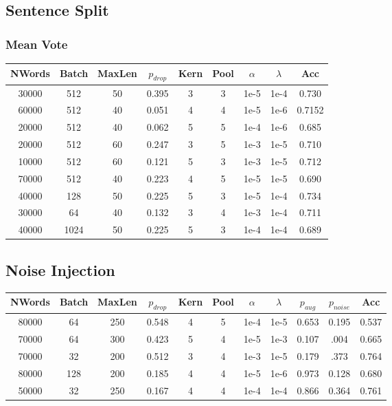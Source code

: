 \subsection{Sentence Split}
\subsubsection{Mean Vote}
\begin{center}\begin{tabular}{||c c c c c c c c c ||}
 \hline
 NWords & Batch & MaxLen & $p_{drop}$ & Kern & Pool & $\alpha$ & $\lambda$ & Acc\\ [0.5ex]
 \hline\hline
 30000 & 512 & 50 & 0.395 & 3 & 3 & 1e-5 & 1e-4 & 0.730\\
 \hline
 60000 & 512 & 40 & 0.051 & 4 & 4 & 1e-5 & 1e-6 & 0.7152\\
 \hline
 20000 & 512 & 40 & 0.062 & 5 & 5 & 1e-4 & 1e-6 & 0.685\\
 \hline
 20000 & 512 & 60 & 0.247 & 3 & 5 & 1e-3 & 1e-5 & 0.710\\
 \hline
 10000 & 512 & 60 & 0.121 & 5 & 3 & 1e-3 & 1e-5 &  0.712\\
 \hline
 70000 & 512 & 40 & 0.223 & 4 & 5 & 1e-5 & 1e-5 &  0.690\\
 \hline
 40000 & 128 & 50 & 0.225 & 5 & 3 & 1e-5 & 1e-4 &  0.734\\
 \hline
 30000 & 64 & 40 & 0.132 & 3 & 4 & 1e-3 & 1e-4 &  0.711\\
 \hline
 40000 & 1024 & 50 & 0.225 & 5 & 3 & 1e-4 & 1e-4 &  0.689\\
 [1ex]\hline\end{tabular}\end{center}

\subsection{Noise Injection}
\begin{center}
 \begin{tabular}{||c c c c c c c c c c c||}
 \hline
 NWords & Batch & MaxLen & $p_{drop}$ & Kern & Pool & $\alpha$ & $\lambda$ & $p_{aug}$ & $p_{noise}$ & Acc\\ [0.5ex]
 \hline\hline
 80000 & 64 & 250 & 0.548 & 4 & 5 & 1e-4 & 1e-5 & 0.653 & 0.195 & 0.537\\
 \hline
 70000 & 64 & 300 & 0.423 & 5 & 4 & 1e-5 & 1e-3 & 0.107 & .004 & 0.665\\
 \hline
 70000 & 32 & 200 & 0.512 & 3 & 4 & 1e-3 & 1e-5 & 0.179 & .373 &  0.764\\
 \hline
 80000 & 128 & 200 & 0.185 & 4 & 4 & 1e-5 & 1e-6 & 0.973 & 0.128 &  0.680\\
 \hline
 50000 & 32 & 250 & 0.167 & 4 & 4 & 1e-4 & 1e-4 & 0.866 & 0.364 & 0.761\\
 [1ex]\hline\end{tabular}\end{center}




